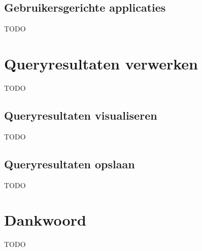 \documentclass[conference]{IEEEtran}
\begin{document}
\subsection{Gebruikersgerichte applicaties}
TODO

\section{Queryresultaten verwerken}
TODO

\subsection{Queryresultaten visualiseren}
TODO

\subsection{Queryresultaten opslaan}
TODO

\section*{Dankwoord}
TODO



\end{document}
